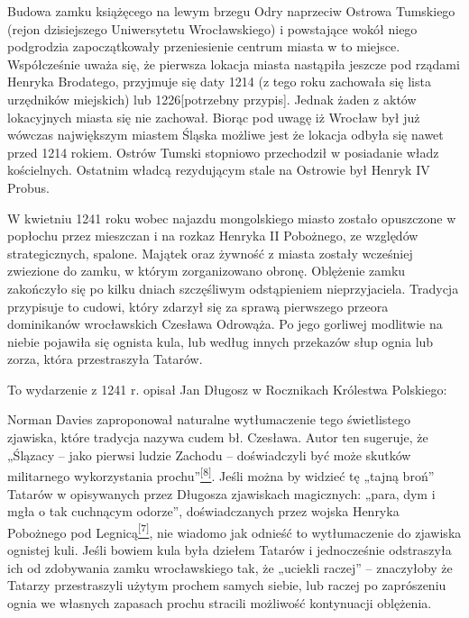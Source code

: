 \documentclass{article}
\begin{document}
Budowa zamku książęcego na lewym brzegu Odry naprzeciw Ostrowa Tumskiego (rejon dzisiejszego Uniwersytetu Wrocławskiego) i powstające wokół niego podgrodzia zapoczątkowały przeniesienie centrum miasta w to miejsce. Współcześnie uważa się, że pierwsza lokacja miasta nastąpiła jeszcze pod rządami Henryka Brodatego, przyjmuje się daty 1214 (z tego roku zachowała się lista urzędników miejskich) lub 1226[potrzebny przypis]. Jednak żaden z aktów lokacyjnych miasta się nie zachował. Biorąc pod uwagę iż Wrocław był już wówczas największym miastem Śląska możliwe jest że lokacja odbyła się nawet przed 1214 rokiem. Ostrów Tumski stopniowo przechodził w posiadanie władz kościelnych. Ostatnim władcą rezydującym stale na Ostrowie był Henryk IV Probus.

W kwietniu 1241 roku wobec najazdu mongolskiego miasto zostało opuszczone w popłochu przez mieszczan i na rozkaz Henryka II Pobożnego, ze względów strategicznych, spalone. Majątek oraz żywność z miasta zostały wcześniej zwiezione do zamku, w którym zorganizowano obronę. Oblężenie zamku zakończyło się po kilku dniach szczęśliwym odstąpieniem nieprzyjaciela. Tradycja przypisuje to cudowi, który zdarzył się za sprawą pierwszego przeora dominikanów wrocławskich Czesława Odrowąża. Po jego gorliwej modlitwie na niebie pojawiła się ognista kula, lub według innych przekazów słup ognia lub zorza, która przestraszyła Tatarów.

To wydarzenie z 1241 r. opisał Jan Długosz w Rocznikach Królestwa Polskiego:

\noindent{}

Norman Davies zaproponował naturalne wytłumaczenie tego świetlistego zjawiska, które tradycja nazywa cudem bł. Czesława. Autor ten sugeruje, że „Ślązacy – jako pierwsi ludzie Zachodu – doświadczyli być może skutków militarnego wykorzystania prochu”\hyperlink{8}{\textsuperscript{[8]}}. Jeśli można by widzieć tę „tajną broń” Tatarów w opisywanych przez Długosza zjawiskach magicznych: „para, dym i mgła o tak cuchnącym odorze”, doświadczanych przez wojska Henryka Pobożnego pod Legnicą\hyperlink{7}{\textsuperscript{[7]}}, nie wiadomo jak odnieść to wytłumaczenie do zjawiska ognistej kuli. Jeśli bowiem kula była dziełem Tatarów i jednocześnie odstraszyła ich od zdobywania zamku wrocławskiego tak, że „uciekli raczej” – znaczyłoby że Tatarzy przestraszyli użytym prochem samych siebie, lub raczej po zaprószeniu ognia we własnych zapasach prochu stracili możliwość kontynuacji oblężenia.
\end{document}
